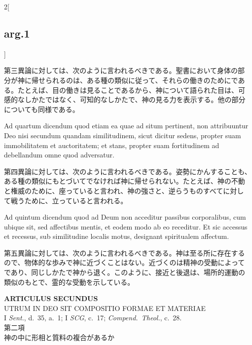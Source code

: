 \documentclass[paper=a4paper,fontsize=10pt,jafontsize=9pt,titlepage]{jlreq}
\begin{document}
\begin{paracol}{2}[\subsection{arg.1}]
\switchcolumn

第三異論に対しては、次のように言われるべきである。聖書において身体の部
分が神に帰せられるのは、ある種の類似に従って、それらの働きのためにであ
る。たとえば、目の働きは見ることであるから、神について語られた目は、可
感的なしかたではなく、可知的なしかたで、神の見る力を表示する。他の部分
についても同様である。

\switchcolumn*[\subsection{ad.4}]

Ad quartum dicendum quod etiam ea quae ad situm pertinent, non
attribuuntur Deo nisi secundum quandam similitudinem, sicut dicitur
sedens, propter suam immobilitatem et auctoritatem; et stans, propter
suam fortitudinem ad debellandum omne quod adversatur.

\switchcolumn

第四異論に対しては、次のように言われるべきである。姿勢にかんすることも、
ある種の類似にもとづいてでなければ神に帰せられない。たとえば、神の不動
と権威のために、座っていると言われ、神の強さと、逆らうものすべてに対し
て戦うために、立っていると言われる。

\switchcolumn*[\subsection{ad.5}]

Ad quintum dicendum quod ad Deum non acceditur passibus corporalibus,
cum ubique sit, sed affectibus mentis, et eodem modo ab eo
receditur. Et sic accessus et recessus, sub similitudine localis
motus, designant spiritualem affectum.

\switchcolumn

第五異論に対しては、次のように言われるべきである。神は至る所に存在する
ので、物体的な歩みで神に近づくことはない。近づくのは精神の受動によって
であり、同じしかたで神から退く。このように、接近と後退は、場所的運動の
類似のもとで、霊的な受動を示している。

\end{paracol}



\newpage
{}
{}
\setcounter{section}{2}
\setcounter{subsection}{0}

\begin{center}
 {\Large {\bfseries ARTICULUS SECUNDUS}}\\
 {\large UTRUM IN DEO SIT COMPOSITIO FORMAE ET MATERIAE}\\
 {\footnotesize I \textit{Sent.}, d.~35, a.~1; I \textit{SCG}, c.~17;
 \textit{Compend.~Theol.}, c.~28.}\\
 {\Large 第二項\\神の中に形相と質料の複合があるか}
\end{center}
\end{document}

